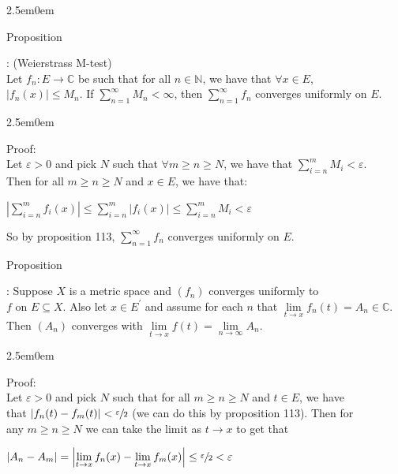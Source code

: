 \documentclass{book}
\newcommand{\hTwo}{%
   \color{MidnightBlue}%
   \fontsize{13}{15}\selectfont%
}
\newcommand{\hThree}{%
   \color{PineGreen!85!Orange}
   \fontsize{13}{15}\selectfont%
}
\newenvironment{myIndent}{%
   \begin{adjustwidth}{2.5em}{0em}%
}{%
   \end{adjustwidth}%
}
\newcounter{PropNumber}
\newcommand{\propCount}[1][1]{%
   \addtocounter{PropNumber}{#1}%
   \thePropNumber%
}
\newcommand{\retTwo}{\hfill\bigbreak}
\begin{document}
{\begin{myIndent}\hTwo
   Proposition \propCount: (Weierstrass M-test)\\ [4pt]
   Let $f_n: E \longrightarrow \mathbb{C}$ be such that for all $n \in \mathbb{N}$, we have that $\forall x \in E$,\\ $|f_n(x)| \leq M_n$. If $\sum\limits_{n=1}^\infty M_n < \infty$, then $\sum\limits_{n=1}^\infty f_n$ converges uniformly on $E$.

   {\begin{myIndent}\hThree
      Proof:\\ [-5pt]
      Let $\varepsilon > 0$ and pick $N$ such that $\forall m \geq n \geq N$, we have that $\sum\limits_{i=n}^m M_i < \varepsilon$.\\ [-8pt]
      Then for all $m \geq n \geq N$ and $x \in E$, we have that: 
      
      {\center $\left|\sum\limits_{i=n}^m f_i(x)\right| \leq \sum\limits_{i=n}^m\left|f_i(x)\right| \leq \sum\limits_{i=n}^m M_i < \varepsilon$ \retTwo\par}

      So by proposition 113, $\sum\limits_{n=1}^\infty f_n$ converges uniformly on $E$.\retTwo
   \end{myIndent}}

   Proposition \propCount: Suppose $X$ is a metric space and $(f_n)$ converges uniformly to\\ $f$ on $E \subseteq X$. Also let $x \in E^\prime$ and assume for each $n$ that $\lim\limits_{t\rightarrow x}f_n(t) = A_n \in \mathbb{C}$.\\ [-6pt] Then $(A_n)$ converges with $\lim\limits_{t \rightarrow x}f(t) = \lim\limits_{n\rightarrow \infty}A_n$.

   {\begin{myIndent}\hThree
      Proof:\\ %
      Let $\varepsilon > 0$ and pick $N$ such that for all $m \geq n \geq N$ and $t \in E$, we have\\ that $|f_n(t) - f_m(t)| < \sfrac{\varepsilon}{2}$ (we can do this by proposition 113). Then for\\ any $m \geq n \geq N$ we can take the limit as $t \rightarrow x$ to get that
      
      {\centering $|A_n - A_m| = \left|\lim\limits_{t \rightarrow x}f_n(x) - \lim\limits_{t \rightarrow x}f_m(x)\right| \leq \sfrac{\varepsilon}{2} < \varepsilon$\retTwo\par}


\end{myIndent}}
\end{myIndent}}
\end{document}

